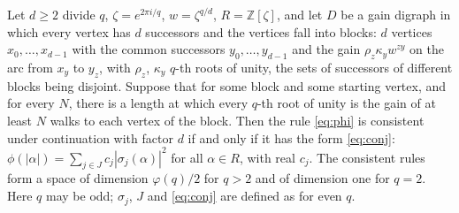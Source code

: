 \begin{theorem}\label{thm:fourier}
Let $d\ge2$ divide $q$, $\zeta=e^{2\pi i/q}$, $w=\zeta^{q/d}$, $R=\mathbb{Z}[\zeta]$, and let $D$ be a gain digraph in which every vertex has $d$ successors and the vertices fall into blocks: $d$ vertices $x_0,\dots,x_{d-1}$ with the common successors $y_0,\dots,y_{d-1}$ and the gain $\rho_z\kappa_yw^{zy}$ on the arc from $x_y$ to $y_z$, with $\rho_z$, $\kappa_y$ $q$-th roots of unity, the sets of successors of different blocks being disjoint. Suppose that for some block and some starting vertex, and for every $N$, there is a length at which every $q$-th root of unity is the gain of at least $N$ walks to each vertex of the block. Then the rule \eqref{eq:phi} is consistent under continuation with factor $d$ if and only if it has the form \eqref{eq:conj}: $\phi(|\alpha|)=\sum_{j\in J}c_j|\sigma_j(\alpha)|^2$ for all $\alpha\in R$, with real $c_j$. The consistent rules form a space of dimension $\varphi(q)/2$ for $q>2$ and of dimension one for $q=2$. Here $q$ may be odd; $\sigma_j$, $J$ and \eqref{eq:conj} are defined as for even $q$.
\end{theorem}

